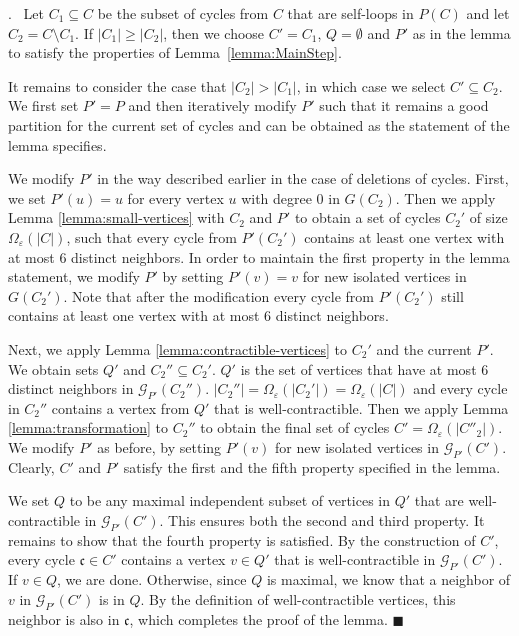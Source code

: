 \documentclass[11pt]{article}
\newenvironment{proof}{\noindent {\bf Proof}.\ }{\qed \par\vskip 4mm\par}
\newcommand{\sq}{\hbox{\rlap{$\sqcap$}$\sqcup$}}
\newcommand{\qed}{\hspace*{\fill}\sq}
\renewcommand{\qed}{\hspace*{\fill}\ensuremath{\blacksquare}}
\def\epsilon{\ensuremath{\varepsilon}}
\begin{document}
\begin{proof}
Let $C_1 \subseteq C$ be the subset of cycles from $C$ that are self-loops in $P(C)$ and let $C_2 = C \setminus C_1$. If $|C_1| \ge |C_2|$, then we choose $C'=C_1$, $Q = \emptyset$ and $P'$ as in the lemma to satisfy the properties of Lemma~\ref{lemma:MainStep}.

It remains to consider the case that $|C_2| > |C_1|$, in which case we select $C' \subseteq C_2$. We first set $P' = P$ and then iteratively modify $P'$ such that it remains a good partition for the current set of cycles and can be obtained as the statement of the lemma specifies.

We modify $P'$ in the way described earlier in the case of deletions of cycles. First, we set $P'(u) = u$ for every vertex $u$ with degree $0$ in $G(C_2)$. Then we apply Lemma \ref{lemma:small-vertices} with $C_2$ and $P'$ to obtain a set of cycles $C_2'$ of size $\Omega_{\epsilon}(|C|)$, such that every cycle from $P'(C_2')$ contains at least one vertex with at most 6 distinct neighbors. In order to maintain the first property in the lemma statement, we modify $P'$ by setting $P'(v) = v$ for new isolated vertices in $G(C_2')$. Note that after the modification every cycle from $P'(C_2')$ still contains at least one vertex with at most 6 distinct neighbors.

Next, we apply Lemma \ref{lemma:contractible-vertices} to $C_2'$ and the current $P'$. We obtain sets $Q'$ and $C_2'' \subseteq C_2'$. $Q'$ is the set of vertices that have at most $6$ distinct neighbors in $\mathcal G_{P'}(C_2'')$. $|C_2''| = \Omega_{\epsilon}(|C_2'|) = \Omega_{\epsilon}(|C|)$ and every cycle in $C_2''$ contains a vertex from $Q'$ that is well-contractible. Then we apply Lemma \ref{lemma:transformation} to $C_2''$ to obtain the final set of cycles $C' = \Omega_{\epsilon}(|C''_2|)$. We modify $P'$ as before, by setting $P'(v)$ for new isolated vertices in $\mathcal G_{P'}(C')$. Clearly, $C'$ and $P'$ satisfy the first and the fifth property specified in the lemma.

We set $Q$ to be any maximal independent subset of vertices in $Q'$ that are well-contractible in $\mathcal G_{P'}(C')$. This ensures both the second and third property. It remains to show that the fourth property is satisfied. By the construction of $C'$, every cycle $\mathfrak{c} \in C'$ contains a vertex $v \in Q'$ that is well-contractible in $\mathcal G_{P'}(C')$. If $v \in Q$, we are done. Otherwise, since $Q$ is maximal, we know that a neighbor of $v$ in $\mathcal G_{P'}(C')$ is in $Q$. By the definition of well-contractible vertices, this neighbor is also in $\mathfrak{c}$, which completes the proof of the lemma.
\end{proof}
\end{document}
